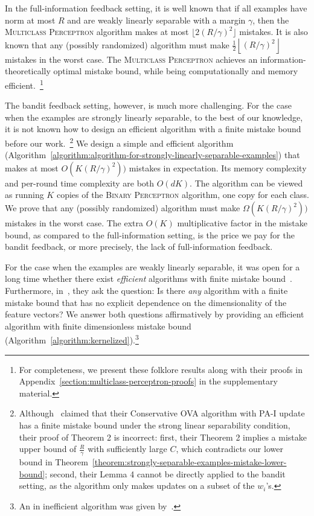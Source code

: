 In the full-information feedback setting, it is well known
\citep{Crammer-Singer-2003} that if all examples have norm at most $R$ and are
weakly linearly separable with a margin $\gamma$, then the \textsc{Multiclass
Perceptron} algorithm makes at most $\lfloor 2(R/\gamma)^2 \rfloor$ mistakes. It
is also known that any (possibly randomized) algorithm must make $\frac{1}{2}
\left\lfloor (R/\gamma)^2 \right \rfloor$ mistakes in the worst case. The
\textsc{Multiclass Perceptron} achieves an information-theoretically optimal
mistake bound, while being computationally and memory efficient.~\footnote{For
completeness, we present these folklore results along with their proofs in
Appendix~\ref{section:multiclass-perceptron-proofs} in the supplementary
material.}

The bandit feedback setting, however, is much more challenging. For the case
when the examples are strongly linearly separable, to the best of our knowledge,
it is not known how to design an efficient algorithm with a finite mistake bound
before our work.~\footnote{Although~\cite{Chen-Chen-Zhang-Chen-Zhang-2009}
claimed that their Conservative OVA algorithm with PA-I update has a finite
mistake bound under the strong linear separability condition, their proof of
Theorem 2 is incorrect: first, their Theorem 2 implies a mistake upper bound of
$\frac{R}{\gamma}$ with sufficiently large $C$, which contradicts our lower
bound in Theorem~\ref{theorem:strongly-separable-examples-mistake-lower-bound};
second, their Lemma 4 cannot be directly applied to the bandit setting, as the
algorithm only makes updates on a subset of the $w_i$'s.} We design a simple and
efficient algorithm
(Algorithm~\ref{algorithm:algorithm-for-strongly-linearly-separable-examples})
that makes at most $O(K (R/\gamma)^2))$ mistakes in expectation. Its memory
complexity and per-round time complexity are both $O(dK)$. The algorithm can be
viewed as running $K$ copies of the \textsc{Binary Perceptron} algorithm, one
copy for each class. We prove that any (possibly randomized) algorithm must make
$\Omega(K (R/\gamma)^2))$ mistakes in the worst case. The extra $O(K)$
multiplicative factor in the mistake bound, as compared to the full-information
setting, is the price we pay for the bandit feedback, or more precisely, the
lack of full-information feedback.

For the case when the examples are weakly linearly separable, it was open for a
long time whether there exist \textit{efficient} algorithms with finite mistake
bound~\cite{Kakade-Shalev-Shwartz-Tewari-2008, Beygelzimer-Orabona-Zhang-2017}.
Furthermore, in~\cite{Kakade-Shalev-Shwartz-Tewari-2008}, they ask the question:
Is there \textit{any} algorithm with a finite mistake bound that has no explicit
dependence on the dimensionality of the feature vectors? We answer both
questions affirmatively by providing an efficient algorithm with finite
dimensionless mistake bound (Algorithm~\ref{algorithm:kernelized}).\footnote{An
in inefficient algorithm was given by~\cite{Daniely-Helbertal-2013}.}

